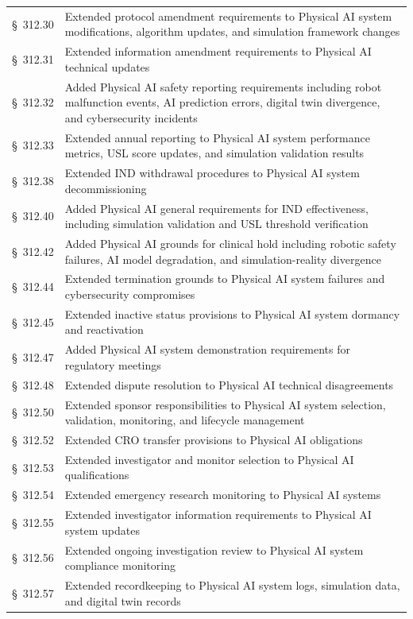 \documentclass[11pt]{article}
\begin{document}
\begin{longtable}{>{\raggedright\arraybackslash}p{2.2cm} >{\raggedright\arraybackslash}p{11.5cm}}
\S~312.30 & Extended protocol amendment requirements to Physical AI system modifications, algorithm updates, and simulation framework changes \\
\S~312.31 & Extended information amendment requirements to Physical AI technical updates \\
\S~312.32 & Added Physical AI safety reporting requirements including robot malfunction events, AI prediction errors, digital twin divergence, and cybersecurity incidents \\
\S~312.33 & Extended annual reporting to Physical AI system performance metrics, USL score updates, and simulation validation results \\
\S~312.38 & Extended IND withdrawal procedures to Physical AI system decommissioning \\
\S~312.40 & Added Physical AI general requirements for IND effectiveness, including simulation validation and USL threshold verification \\
\S~312.42 & Added Physical AI grounds for clinical hold including robotic safety failures, AI model degradation, and simulation-reality divergence \\
\S~312.44 & Extended termination grounds to Physical AI system failures and cybersecurity compromises \\
\S~312.45 & Extended inactive status provisions to Physical AI system dormancy and reactivation \\
\S~312.47 & Added Physical AI system demonstration requirements for regulatory meetings \\
\S~312.48 & Extended dispute resolution to Physical AI technical disagreements \\
\S~312.50 & Extended sponsor responsibilities to Physical AI system selection, validation, monitoring, and lifecycle management \\
\S~312.52 & Extended CRO transfer provisions to Physical AI obligations \\
\S~312.53 & Extended investigator and monitor selection to Physical AI qualifications \\
\S~312.54 & Extended emergency research monitoring to Physical AI systems \\
\S~312.55 & Extended investigator information requirements to Physical AI system updates \\
\S~312.56 & Extended ongoing investigation review to Physical AI system compliance monitoring \\
\S~312.57 & Extended recordkeeping to Physical AI system logs, simulation data, and digital twin records \\

\end{longtable}
\end{document}
